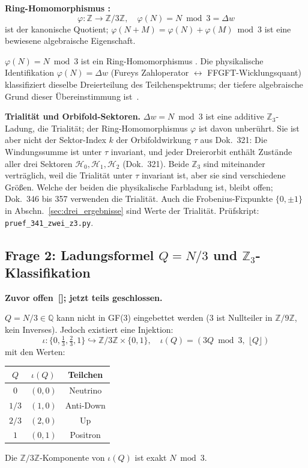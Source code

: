 \textbf{Ring-Homomorphismus \BM:}
\begin{equation}
  \varphi: \mathbb{Z} \to \mathbb{Z}/3\mathbb{Z}, \quad \varphi(N) = N\bmod 3 = \Delta w
\end{equation}
ist der kanonische Quotient; $\varphi(N+M)=\varphi(N)+\varphi(M)\bmod 3$
ist eine bewiesene algebraische Eigenschaft.

\begin{keyresult}
$\varphi(N) = N\bmod 3$ ist ein Ring-Homo\-morphismus \BM.
Die physikalische Identifikation $\varphi(N) = \Delta w$
(Fureys Zahloperator $\leftrightarrow$ FFGFT-Wicklungsquant)
klassifiziert dieselbe Dreierteilung des Teilchenspektrums;
der tiefere algebraische Grund dieser Übereinstimmung ist~\KM.
\end{keyresult}

\textbf{Trialität und Orbifold-Sektoren.}
$\Delta w=N\bmod 3$ ist eine additive $\mathbb{Z}_3$-Ladung, die Trialität;
der Ring-Homomorphismus $\varphi$ ist davon unberührt. Sie ist aber nicht der
Sektor-Index $k$ der Orbifoldwirkung $\tau$ aus Dok.~321: Die Windungssumme ist
unter $\tau$ invariant, und jeder Dreierorbit enthält Zustände aller drei
Sektoren $\mathcal H_0,\mathcal H_1,\mathcal H_2$ (Dok.~321). Beide $\mathbb{Z}_3$
sind miteinander verträglich, weil die Trialität unter $\tau$ invariant ist,
aber sie sind verschiedene Größen. Welche der beiden die physikalische
Farbladung ist, bleibt offen; Dok.~346 bis 357 verwenden die Trialität.
Auch die Frobenius-Fixpunkte $\{0,\pm1\}$ in Abschn.~\ref{sec:drei_ergebnisse}
sind Werte der Trialität. Prüfskript: \texttt{pruef\_341\_zwei\_z3.py}.

\subsection{Frage 2: Ladungsformel $Q=N/3$ und $\mathbb{Z}_3$-Klassifikation}

\textbf{Zuvor offen~[\SM]; jetzt teils geschlossen.}

$Q = N/3\in\mathbb{Q}$ kann nicht in GF(3) eingebettet werden
(3 ist Nullteiler in $\mathbb{Z}/9\mathbb{Z}$, kein Inverses).
Jedoch existiert eine Injektion:
\begin{equation}
  \iota: \{0,\tfrac{1}{3},\tfrac{2}{3},1\} \hookrightarrow
  \mathbb{Z}/3\mathbb{Z}\times\{0,1\},\quad
  \iota(Q) = (3Q\bmod 3,\;\lfloor Q\rfloor)
\end{equation}
mit den Werten:
\begin{center}
\begin{tabular}{ccc}
\toprule
$Q$ & $\iota(Q)$ & Teilchen \\
\midrule
$0$   & $(0,0)$ & Neutrino \\
$1/3$ & $(1,0)$ & Anti-Down \\
$2/3$ & $(2,0)$ & Up \\
$1$   & $(0,1)$ & Positron \\
\bottomrule
\end{tabular}
\end{center}
Die $\mathbb{Z}/3\mathbb{Z}$-Komponente von $\iota(Q)$ ist exakt $N\bmod 3$.

